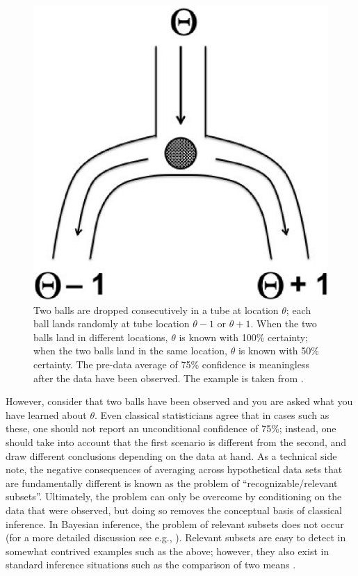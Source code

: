 \begin{figure}[tbh]
    \begin{center}
        \includegraphics[width=.5\textwidth]{figs/bi1_BergerWolpertBalls.eps}
        \caption{Two balls are dropped consecutively in a tube at location $\theta$; each ball lands randomly at tube location $\theta-1$ or $\theta+1$. When the two balls land in different locations, $\theta$ is known with 100\% certainty; when the two balls land in the same location, $\theta$ is known with 50\% certainty. The pre-data average of 75\% confidence is meaningless after the data have been observed. The example is taken from \protect{}.}\label{fig:bi1:TwoBalls}
    \end{center}
\end{figure}

However, consider that two balls have been observed and you are asked what you have learned about $\theta$. Even classical statisticians agree that in cases such as these, one should not report an unconditional confidence of 75\%; instead, one should take into account that the first scenario is different from the second, and draw different conclusions depending on the data at hand. As a technical side note, the negative consequences of averaging across hypothetical data sets that are fundamentally different is known as the problem of ``recognizable/relevant subsets''. Ultimately, the problem can only be overcome by conditioning on the data that were observed, but doing so removes the conceptual basis of classical inference. In Bayesian inference, the problem of relevant subsets does not occur (for a more detailed discussion see e.g., ). Relevant subsets are easy to detect in somewhat contrived examples such as the above; however, they also exist in standard inference situations such as the comparison of two means \cite{BuehlerFedderson1963}.


